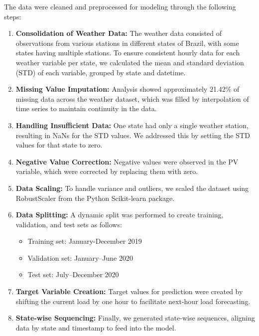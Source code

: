 \documentclass[sigconf,nonacm]{acmart}
\begin{document}
The data were cleaned and preprocessed for modeling through the following steps:
\begin{enumerate}
    \item \textbf{Consolidation of Weather Data:} The weather data consisted of observations from various stations in different states of Brazil, with some states having multiple stations. To ensure consistent hourly data for each weather variable per state, we calculated the mean and standard deviation (STD) of each variable, grouped by state and datetime.

    \item \textbf{Missing Value Imputation:} Analysis showed approximately 21.42\% of missing data across the weather dataset, which was filled by interpolation of time series to maintain continuity in the data.

    \item \textbf{Handling Insufficient Data:} One state had only a single weather station, resulting in NaNs for the STD values. We addressed this by setting the STD values for that state to zero.

    \item \textbf{Negative Value Correction:} Negative values were observed in the PV variable, which were corrected by replacing them with zero.

    \item \textbf{Data Scaling:} To handle variance and outliers, we scaled the dataset using RobustScaler from the Python Scikit-learn package.

    \item \textbf{Data Splitting:} A dynamic split was performed to create training, validation, and test sets as follows:
    \begin{itemize}
        \item Training set: January-December 2019
        \item Validation set: January–June 2020
        \item Test set: July–December 2020
    \end{itemize}

    \item \textbf{Target Variable Creation:} Target values for prediction were created by shifting the current load by one hour to facilitate next-hour load forecasting.

    \item \textbf{State-wise Sequencing:} Finally, we generated state-wise sequences, aligning data by state and timestamp to feed into the model.
\end{enumerate}
\end{document}
